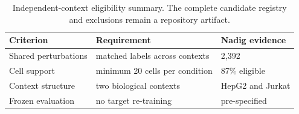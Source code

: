 \begin{table}[t]
\centering
\small
\caption{Independent-context eligibility summary. The complete candidate registry and exclusions remain a repository artifact.}
\label{tab:registry}
\begin{tabular}{lll}
\toprule
Criterion & Requirement & Nadig evidence \\
\midrule
Shared perturbations & matched labels across contexts & 2,392 \\
Cell support & minimum 20 cells per condition & 87\% eligible \\
Context structure & two biological contexts & HepG2 and Jurkat \\
Frozen evaluation & no target re-training & pre-specified \\
\bottomrule
\end{tabular}
\end{table}
